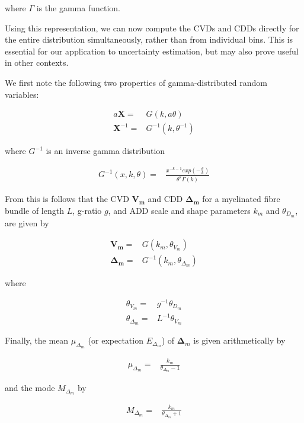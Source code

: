 where $\Gamma$ is the gamma function. 

Using this representation, we can now compute the CVDs and CDDs directly for the entire distribution simultaneously, rather than from individual bins. This is essential for our application to uncertainty estimation, but may also prove useful in other contexts.


We first note the following two properties of gamma-distributed random variables: 

\begin{eqnarray}
a \mathbf{X} =& G(k,a \theta ) \\
\mathbf{X}^{-1} =& G^{-1}(k,\theta^{-1} )
\end{eqnarray}

where $G^{-1}$ is an inverse gamma distribution

\begin{eqnarray}
G^{-1}(x,k,\theta) =& \frac{\displaystyle x^{-k-1} exp(- \frac{\displaystyle \theta}{ \displaystyle k})}{\displaystyle \theta^{k} \Gamma(k)} 
\end{eqnarray}

From this is follows that the CVD $\mathbf{V_m}$ and CDD $\mathbf{\Delta_m}$ for a myelinated fibre bundle of length $L$, g-ratio $g$, and ADD scale and shape parameters $k_m$ and $\theta_{D_{m}}$, are given by 

\begin{eqnarray}
\mathbf{V_m} =& G(k_m, \theta_{V_{m}}) \\
\mathbf{\Delta_m} =& G^{-1}(k_m, \theta_{\Delta_{m}})
\end{eqnarray}

where 

\begin{eqnarray}
\theta_{V{_m}} =& g^{-1} \theta_{D_{m}}  \\
\theta_{\Delta{_m}} =& L^{-1} \theta_{V_{m}}
\end{eqnarray}

Finally, the mean $\mu_{\Delta_m}$ (or expectation $E_{\Delta_m}$) of $\mathbf{\Delta}_m$ is given arithmetically by 

\begin{eqnarray}
\mu_{\Delta_m} =& \frac{\displaystyle k_m}{\displaystyle \theta_{\Delta_m} -1} \end{eqnarray}

and the mode $M_{\Delta_m}$ by 

\begin{eqnarray}
M_{\Delta_m} =& \frac{\displaystyle k_m}{\displaystyle \theta_{\Delta_m} +1}
\end{eqnarray}

